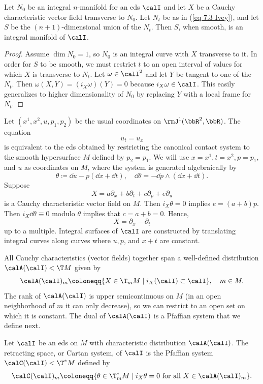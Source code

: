 \begin{prop}\label{prop 7.1.8 Ivey}
    Let $N_0$ be an integral $n$-manifold for an \gls{eds} $\calI$ and let $X$ be a Cauchy characteristic vector field transverse to $N_0$. Let $N_t$ be as in (\ref{eq 7.3 Ivey}), and let $S$ be the $(n+1)$-dimensional union of the $N_t$. Then $S$, when smooth, is an integral manifold of $\calI$.
\end{prop}
\begin{proof}
    Assume $\dim N_0=1$, so $N_0$ is an integral curve with $X$ transverse to it. In order for $S$ to be smooth, we must restrict $t$ to an open interval of values for which $X$ is transverse to $N_t$. Let $\omega\in\calI^2$ and let $Y$ be tangent to one of the $N_t$. Then $\omega(X,Y)=(i_X\omega)(Y)=0$ because $i_X\omega\in\calI$.  This easily generalizes to higher dimensionality of $N_0$ by replacing $Y$ with a local frame for $N_t$.
\end{proof}


\begin{example}
    Let $(x^1,x^2,u,p_1,p_2)$ be the usual coordinates on $\rmJ^1(\bbR^2,\bbR)$. The equation 
    \[u_t=u_x\] 
    is equivalent to the \gls{eds} obtained by restricting the canonical contact system to the smooth hypersurface $M$ defined by $p_2=p_1$. We will use $x=x^1,t=x^2,p=p_1$, and $u$ as coordinates on $M$, where the system is generated algebraically by 
    \[\theta\coloneqq \dd u-p(\dd x+\dd t),\quad \dd\theta=-\dd p\wedge(\dd x+\dd t).\]
    Suppose 
    \[X=a\partial_x+b\partial_t+c\partial_p+e\partial_u\]
    is a Cauchy characteristic vector field on $M$. Then $i_X\theta=0$ implies $e=(a+b)p$. Then $i_X\dd \theta\equiv 0$ modulo $\theta$ implies that $c=a+b=0$. Hence,
    \[X=\partial_x-\partial_t\]
    up to a multiple. Integral surfaces of $\calI$ are constructed by translating integral curves along curves where $u,p$, and $x+t$ are constant.
\end{example}

All Cauchy characteristics (vector fields) together span a well-defined distribution $\calA(\calI)< \T M$ given by 
\[\calA(\calI)_m\coloneqq \{X\in \T_mM\mid i_X(\calI)\subset \calI\},\quad m\in M.\]
The rank of $\calA(\calI)$ is upper semicontinuous on $M$ (in an open neighborhood of $m$ it can only decrease), so we can restrict to an open set on which it is constant. The dual of $\calA(\calI)$ is a Pfaffian system that we define next.

\begin{defn}
    Let $\calI$ be an \gls{eds} on $M$ with characteristic distribution $\calA(\calI)$. The retracting space, or Cartan system, of $\calI$ is the Pfaffian system $\calC(\calI)<\T^\ast M$ defined by 
    \[\calC(\calI)_m\coloneqq \{\theta\in \T^\ast_m M\mid i_X\theta=0 \text{ for all }X\in \calA(\calI)_m\}.\]
\end{defn}

